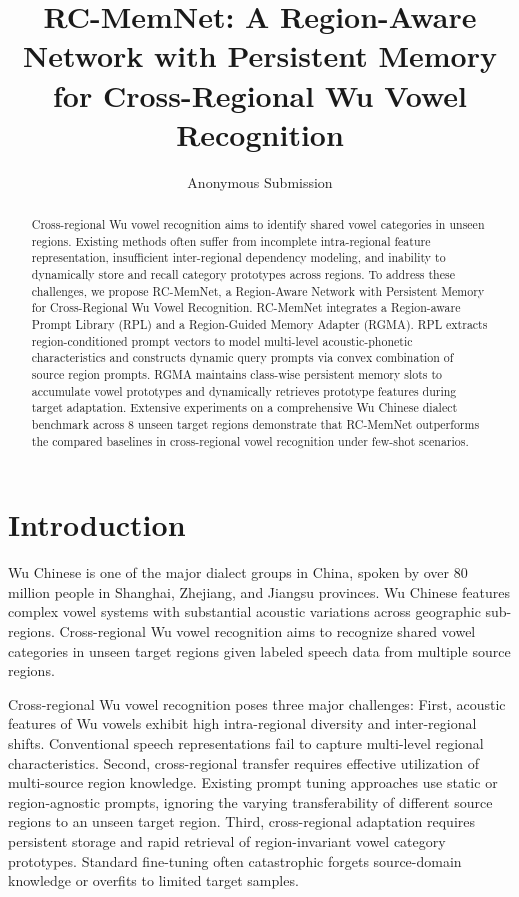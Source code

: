 \documentclass[letterpaper]{article} %
\title{RC-MemNet: A Region-Aware Network with Persistent Memory for Cross-Regional Wu Vowel Recognition}
\author{Anonymous Submission}
\begin{document}
\maketitle

\begin{abstract}
Cross-regional Wu vowel recognition aims to identify shared vowel categories in unseen regions. Existing methods often suffer from incomplete intra-regional feature representation, insufficient inter-regional dependency modeling, and inability to dynamically store and recall category prototypes across regions. To address these challenges, we propose RC-MemNet, a Region-Aware Network with Persistent Memory for Cross-Regional Wu Vowel Recognition. RC-MemNet integrates a Region-aware Prompt Library (RPL) and a Region-Guided Memory Adapter (RGMA). RPL extracts region-conditioned prompt vectors to model multi-level acoustic-phonetic characteristics and constructs dynamic query prompts via convex combination of source region prompts. RGMA maintains class-wise persistent memory slots to accumulate vowel prototypes and dynamically retrieves prototype features during target adaptation. Extensive experiments on a comprehensive Wu Chinese dialect benchmark across 8 unseen target regions demonstrate that RC-MemNet outperforms the compared baselines in cross-regional vowel recognition under few-shot scenarios.
\end{abstract}

\section{Introduction}
Wu Chinese is one of the major dialect groups in China, spoken by over 80 million people in Shanghai, Zhejiang, and Jiangsu provinces. Wu Chinese features complex vowel systems with substantial acoustic variations across geographic sub-regions. Cross-regional Wu vowel recognition aims to recognize shared vowel categories in unseen target regions given labeled speech data from multiple source regions.

Cross-regional Wu vowel recognition poses three major challenges:
First, acoustic features of Wu vowels exhibit high intra-regional diversity and inter-regional shifts. Conventional speech representations fail to capture multi-level regional characteristics.
Second, cross-regional transfer requires effective utilization of multi-source region knowledge. Existing prompt tuning approaches use static or region-agnostic prompts, ignoring the varying transferability of different source regions to an unseen target region.
Third, cross-regional adaptation requires persistent storage and rapid retrieval of region-invariant vowel category prototypes. Standard fine-tuning often catastrophic forgets source-domain knowledge or overfits to limited target samples.
\end{document}
